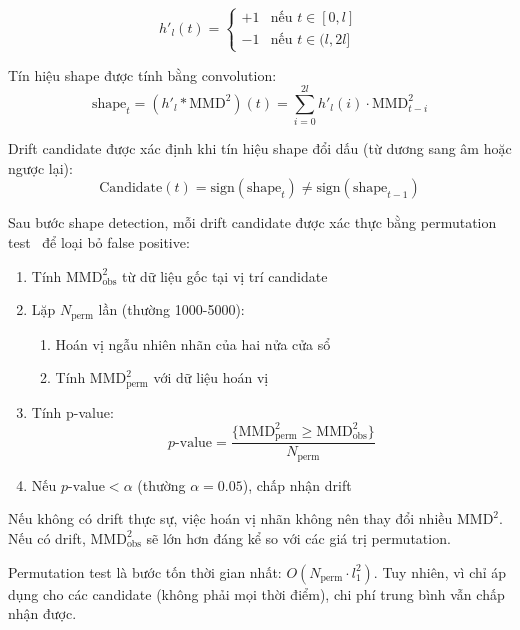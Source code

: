 \begin{equation}
	h'_l(t) = \begin{cases}
		+1 & \text{nếu } t \in [0, l]  \\
		-1 & \text{nếu } t \in (l, 2l]
	\end{cases}
\end{equation}

Tín hiệu shape được tính bằng convolution:
\begin{equation}
	\text{shape}_t = (h'_l * \text{MMD}^2)(t) = \sum_{i=0}^{2l} h'_l(i) \cdot \text{MMD}^2_{t-i}
\end{equation}

Drift candidate được xác định khi tín hiệu shape đổi dấu (từ dương sang âm hoặc ngược lại):
\begin{equation}
	\text{Candidate}(t) = \text{sign}(\text{shape}_t) \neq \text{sign}(\text{shape}_{t-1})
\end{equation}

Sau bước shape detection, mỗi drift candidate được xác thực bằng permutation test~\cite{good2000permutation} để loại bỏ false positive:

\begin{enumerate}
	\item Tính $\text{MMD}^2_{\text{obs}}$ từ dữ liệu gốc tại vị trí candidate
	\item Lặp $N_{\text{perm}}$ lần (thường 1000-5000):
	      \begin{enumerate}
		      \item Hoán vị ngẫu nhiên nhãn của hai nửa cửa sổ
		      \item Tính $\text{MMD}^2_{\text{perm}}$ với dữ liệu hoán vị
	      \end{enumerate}
	\item Tính p-value:
	      \begin{equation}
		      p\text{-value} = \frac{\{\text{MMD}^2_{\text{perm}} \geq \text{MMD}^2_{\text{obs}}\}}{N_{\text{perm}}}
	      \end{equation}
	\item Nếu $p\text{-value} < \alpha$ (thường $\alpha = 0.05$), chấp nhận drift
\end{enumerate}

Nếu không có drift thực sự, việc hoán vị nhãn không nên thay đổi nhiều $\text{MMD}^2$. Nếu có drift, $\text{MMD}^2_{\text{obs}}$ sẽ lớn hơn đáng kể so với các giá trị permutation.

Permutation test là bước tốn thời gian nhất: $O(N_{\text{perm}} \cdot l_1^2)$. Tuy nhiên, vì chỉ áp dụng cho các candidate (không phải mọi thời điểm), chi phí trung bình vẫn chấp nhận được.

